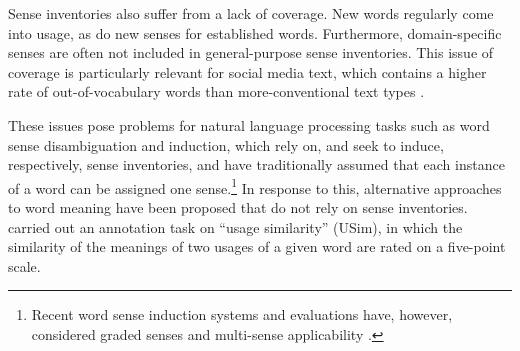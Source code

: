 \documentclass[11pt]{article}
\begin{document}

Sense inventories also suffer from a lack of coverage. New words
regularly come into usage, as do new senses for established
words. Furthermore, domain-specific senses are often not included in
general-purpose sense inventories.
This issue of coverage is particularly relevant for social media text,
which contains a higher rate of out-of-vocabulary words than
more-conventional text types \citep{Baldwin+:2013}.



These issues pose problems for natural language processing tasks such
as word sense disambiguation and induction, which rely on, and seek to
induce, respectively, sense inventories, and have traditionally
assumed that each instance of a word can be assigned one
sense.\footnote{Recent word sense induction systems and evaluations
  have, however, considered graded senses and multi-sense
  applicability \citep[e.g.,][]{Jurgens:Klapaftis:2013}.} In response
to this, alternative approaches to word meaning have been proposed
that do not rely on sense inventories. \cite{Erk2009b} carried out an
annotation task on ``usage similarity'' (USim), in which the
similarity of the meanings of two usages of a given word are rated on
a five-point scale.

\end{document}
